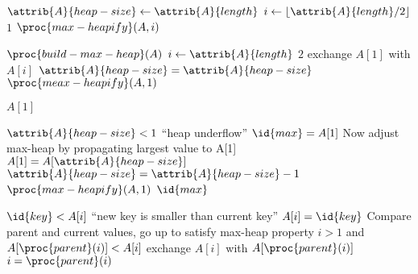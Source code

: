 \documentclass{article}
\begin{document}
\begin{codebox}
\li $\attrib{A}{heap-size} \gets \attrib{A}{length}$ 
\li \For $i \gets \lfloor \attrib{A}{length}/2 \rfloor$ \Downto $1$
\li \Do
        $\proc{max-heapify}(A, i)$
    \End
\end{codebox}

\begin{codebox}
\li $\proc{build-max-heap}(A)$
\li \For $i \gets \attrib{A}{length}$ \Downto $2$
\li \Do
        exchange $A[1]$ with $A[i]$
\li     $\attrib{A}{heap-size} = \attrib{A}{heap-size}$
\li     $\proc{meax-heapify}(A, 1)$
    \End
\end{codebox}

\begin{codebox}
\li \Return $A[1]$
\end{codebox}

\begin{codebox}
\li \If $\attrib{A}{heap-size} < 1$
\li \Then
        \Error ``heap underflow''
    \End
\li $\id{max} = A[1]$
\li \Comment Now adjust max-heap by propagating largest value to A[1]
\li $A[1] = A[\attrib{A}{heap-size}]$
\li $\attrib{A}{heap-size} = \attrib{A}{heap-size} - 1$
\li $\proc{max-heapify}(A, 1)$
\li \Return $\id{max}$
\end{codebox}

\begin{codebox}
\li \If $\id{key} < A[i]$
\li \Then
        \Error ``new key is smaller than current key''
    \End
\li $A[i] = \id{key}$
\li \Comment Compare parent and current values, go up to satisfy max-heap property
\li \While $i >  1$ and $A[\proc{parent}(i)] < A[i]$
\li \Do
        exchange $A[i]$ with $A[\proc{parent}(i)]$
\li     $i = \proc{parent}(i)$
    \End
\end{codebox}
\end{document}
